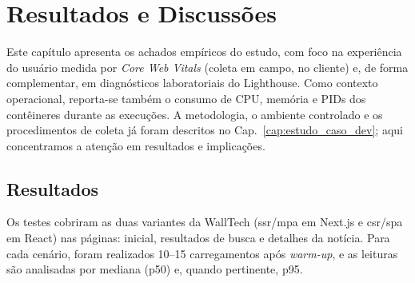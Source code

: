\chapter{Resultados e Discussões}
\label{cap:resultados}

Este capítulo apresenta os achados empíricos do estudo, com foco na experiência do usuário medida por \textit{Core Web Vitals} (coleta em campo, no cliente) e, de forma complementar, em diagnósticos laboratoriais do Lighthouse. Como contexto operacional, reporta-se também o consumo de CPU, memória e PIDs dos contêineres durante as execuções. A metodologia, o ambiente controlado e os procedimentos de coleta já foram descritos no Cap.~\ref{cap:estudo_caso_dev}; aqui concentramos a atenção em resultados e implicações.

\section{Resultados}
Os testes cobriram as duas variantes da WallTech (\acrshort{ssr}/\acrshort{mpa} em Next.js e \acrshort{csr}/\acrshort{spa} em React) nas páginas: inicial, resultados de busca e detalhes da notícia. Para cada cenário, foram realizados 10--15 carregamentos após \textit{warm-up}, e as leituras são analisadas por mediana (p50) e, quando pertinente, p95.

